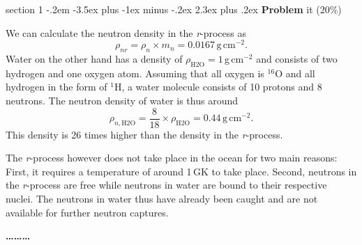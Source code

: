 \documentclass[letterpaper,12pt,twoside=false,DIV=11]{scrartcl}
\makeatletter
\newenvironment{problem}{\@startsection
    {section}
    {1}
    {-.2em}
    {-3.5ex plus -1ex minus -.2ex}
    {2.3ex plus .2ex}
    {
        \pagebreak[3] %
        \noindent\sffamily\bfseries Problem
    }
}
{
    \begin{center}\large\bfseries\ldots\ldots\ldots\end{center}
}
\providecommand{\ex}[1]{\ensuremath{^{#1}}}
\makeatother
\begin{document}
\begin{problem}{it (20\%)}

We can calculate the neutron density in the \textit{r}-process as 
\begin{equation}
    \rho_{nr} = \rho_n \times m_n = 0.0167 \,\mathrm{g}\,\mathrm{cm}^{-2}.
\end{equation}
Water on the other hand has a density of $\rho_\mathrm{H2O} = 1$\,g\,cm$^{-2}$ and consists of two hydrogen and one oxygen atom. Assuming that all oxygen is \ex{16}O and all hydrogen in the form of \ex{1}H, a water molecule consists of 10 protons and 8 neutrons. The neutron density of water is thus around
\begin{equation}
    \rho_{n,\mathrm{H2O}} = \frac{8}{18} \times \rho_\mathrm{H2O} = 0.44  \,\mathrm{g}\,\mathrm{cm}^{-2}.
\end{equation}
This density is 26 times higher than the density in the \textit{r}-process.

The \textit{r}-process however does not take place in the ocean for two main reasons: First, it requires a temperature of around 1\,GK to take place. Second, neutrons in the \textit{r}-process are free while neutrons in water are bound to their respective nuclei. The neutrons in water thus have already been caught and are not available for further neutron captures.
\end{problem}
\end{document}
